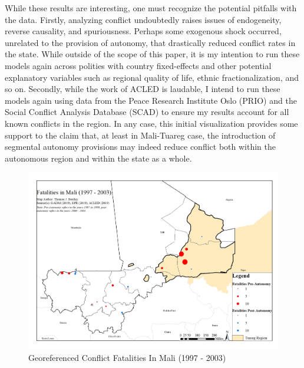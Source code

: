 \documentclass[12pt]{article}
\begin{document}
While these results are interesting, one must recognize the potential pitfalls with the data. Firstly, analyzing conflict undoubtedly raises issues of endogeneity, reverse causality, and spuriousness. Perhaps some exogenous shock occurred, unrelated to the provision of autonomy, that drastically reduced conflict rates in the state. While outside of the scope of this paper, it is my intention to run these models again across polities with country fixed-effects and other potential explanatory variables such as regional quality of life, ethnic fractionalization, and so on. Secondly, while the work of ACLED is laudable, I intend to run these models again using data from the Peace Research Institute Oslo (PRIO) and the Social Conflict Analysis Database (SCAD) to ensure my results account for all known conflicts in the region. In any case, this initial visualization provides some support to the claim that, at least in Mali-Tuareg case, the introduction of segmental autonomy provisions may indeed reduce conflict both within the autonomous region and within the state as a whole. 

\begin{figure}[h]
\centering\includegraphics[width=\textwidth,height=\textheight,keepaspectratio]{tjbrailey_final_project_map_conf.jpg}
\caption{Georeferenced Conflict Fatalities In Mali (1997 - 2003)}
\end{figure}
\end{document}
